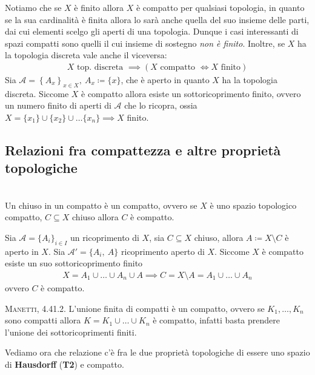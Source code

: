 \begin{observe}
Notiamo che se $X$ è finito allora $X$ è compatto per qualsiasi topologia, in quanto se la sua cardinalità è finita allora lo sarà anche quella del suo insieme delle parti, dai cui elementi scelgo gli aperti di una topologia. Dunque i casi interessanti di spazi compatti sono quelli il cui insieme di sostegno \textit{non è finito}.\newline
Inoltre, se $X$ ha la topologia discreta vale anche il viceversa:
	\begin{gather*}
		X \text{ top. discreta } \implies \left( X \text{ compatto } \iff X \text{ finito}\right)
	\end{gather*}
Sia $\mathcal{A}=\left\{ A_x\right\}_{x\in X}, \ A_x\coloneqq \{x\}$, che è aperto in quanto $X$ ha la topologia discreta. Siccome $X$ è compatto allora esiste un sottoricoprimento finito, ovvero un numero finito di aperti di $\mathcal{A}$ che lo ricopra, ossia $X=\{x_1\}\cup\{x_2\}\cup\dots\{x_n\}\implies X$ finito.
\end{observe}
\subsection{Relazioni fra compattezza e altre proprietà topologiche}
\begin{theorema}~{}\\ \label{chiuso in compatto}
	Un chiuso in un compatto è un compatto, ovvero se $X$ è uno spazio topologico compatto, $C\subseteq X$ chiuso allora $C$ è compatto.
\end{theorema}
\begin{demonstration}
	Sia $\mathcal{A}=\{A_i \}_{i\in I}$ un ricoprimento di $X$, sia $C\subseteq X$ chiuso, allora $A\coloneqq X\setminus C$ è aperto in $X$.\newline
	Sia $\mathcal{A}'=\{A_i,\ A\}$ ricoprimento aperto di $X$. Siccome $X$ è compatto esiste un suo sottoricoprimento finito
		\begin{gather*}
			X=A_1\cup\dots\cup A_n\cup A \implies C=X\setminus A=A_1\cup\dots\cup A_n
		\end{gather*}
	ovvero $C$ è compatto.
\end{demonstration}

\begin{observe}\textsc{Manetti, 4.41.2.}
	L'unione finita di compatti è un compatto, ovvero se $K_1,\dots,K_n$ sono compatti allora $K=K_1\cup\dots\cup K_n$ è compatto, infatti basta prendere l'unione dei sottoricoprimenti finiti.
\end{observe}
Vediamo ora che relazione c'è fra le due proprietà topologiche di essere uno spazio di \textbf{Hausdorff} (\textbf{T2}) e compatto.

